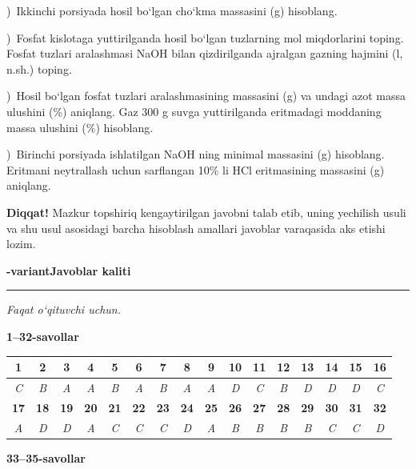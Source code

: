 \documentclass[11pt,a4paper]{article}
\newcommand{\qsep}{\par\vspace{13pt}}
\newcommand{\diqqat}[1]{\par\smallskip\noindent\textbf{Diqqat!} #1\par\medskip}
\begin{document}
)\ Ikkinchi porsiyada hosil bo`lgan cho`kma massasini (g) hisoblang.\par
{})\ Fosfat kislotaga yuttirilganda hosil bo`lgan tuzlarning mol miqdorlarini toping. Fosfat tuzlari aralashmasi NaOH bilan qizdirilganda ajralgan gazning hajmini (l, n.sh.) toping.\par
{})\ Hosil bo`lgan fosfat tuzlari aralashmasining massasini (g) va undagi azot massa ulushini (\%) aniqlang. Gaz 300 g suvga yuttirilganda eritmadagi moddaning massa ulushini (\%) hisoblang.\par
{})\ Birinchi porsiyada ishlatilgan NaOH ning minimal massasini (g) hisoblang. Eritmani neytrallash uchun sarflangan 10\% li HCl eritmasining massasini (g) aniqlang.\par
\diqqat{Mazkur topshiriq kengaytirilgan javobni talab etib, uning yechilish usuli va shu usul asosidagi barcha hisoblash amallari javoblar varaqasida aks etishi lozim.}\qsep
\newpage
\noindent\textbf{\fontsize{13}{15}-variant}\hfill \textbf{Javoblar kaliti}\par\smallskip\hrule\smallskip
\textit{Faqat o`qituvchi uchun.}\par\medskip
\noindent\textbf{1--32-savollar}\par\smallskip
\noindent\begin{tabular}{|c|c|c|c|c|c|c|c|c|c|c|c|c|c|c|c|}\hline
\textbf{1} & \textbf{2} & \textbf{3} & \textbf{4} & \textbf{5} & \textbf{6} & \textbf{7} & \textbf{8} & \textbf{9} & \textbf{10} & \textbf{11} & \textbf{12} & \textbf{13} & \textbf{14} & \textbf{15} & \textbf{16}\\\hline
\textsl{C} & \textsl{B} & \textsl{A} & \textsl{A} & \textsl{B} & \textsl{A} & \textsl{B} & \textsl{A} & \textsl{A} & \textsl{D} & \textsl{C} & \textsl{B} & \textsl{D} & \textsl{D} & \textsl{D} & \textsl{C}\\\hline
\textbf{17} & \textbf{18} & \textbf{19} & \textbf{20} & \textbf{21} & \textbf{22} & \textbf{23} & \textbf{24} & \textbf{25} & \textbf{26} & \textbf{27} & \textbf{28} & \textbf{29} & \textbf{30} & \textbf{31} & \textbf{32}\\\hline
\textsl{A} & \textsl{D} & \textsl{D} & \textsl{A} & \textsl{C} & \textsl{C} & \textsl{C} & \textsl{D} & \textsl{A} & \textsl{B} & \textsl{B} & \textsl{B} & \textsl{B} & \textsl{C} & \textsl{C} & \textsl{D}\\\hline
\end{tabular}\par\medskip
\noindent\textbf{33--35-savollar}\par\smallskip
\end{document}
